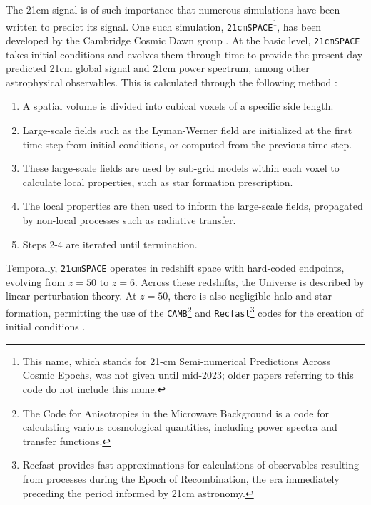\documentclass[floats,floatfix,showpacs,amssymb,prd,superscriptaddress,nofootinbib]{revtex4-2} %
\newcommand{\code}{\texttt}
\begin{document}
The 21cm signal is of such importance that numerous simulations have been written to predict its signal. One such simulation, \code{21cmSPACE}\footnote{This name, which stands for 21-cm Semi-numerical Predictions Across Cosmic Epochs, was not given until mid-2023; older papers referring to this code do not include this name.}, has been developed by the Cambridge Cosmic Dawn group \cite{Fialkov_2014}\cite{Visbal_2012}. At the basic level, \code{21cmSPACE} takes initial conditions and evolves them through time to provide the present-day predicted 21cm global signal and 21cm power spectrum, among other astrophysical observables. This is calculated through the following method \cite{gessey-jones_2024}:

\begin{enumerate}
    \item A spatial volume is divided into cubical voxels of a specific side length.

    \item Large-scale fields such as the Lyman-Werner field are initialized at the first time step from initial conditions, or computed from the previous time step.

    \item These large-scale fields are used by sub-grid models within each voxel to calculate local properties, such as star formation prescription.

    \item The local properties are then used to inform the large-scale fields, propagated by non-local processes such as radiative transfer.

    \item Steps 2-4 are iterated until termination.
\end{enumerate}


Temporally, \code{21cmSPACE} operates in redshift space with hard-coded endpoints, evolving from $z = 50$ to $z = 6$. Across these redshifts, the Universe is described by linear perturbation theory. At $z = 50$, there is also negligible halo and star formation, permitting the use of the \code{CAMB}\footnote{The Code for Anisotropies in the Microwave Background is a code for calculating various cosmological quantities, including power spectra and transfer functions.} and \code{Recfast}\footnote{Recfast provides fast approximations for calculations of observables resulting from processes during the Epoch of Recombination, the era immediately preceding the period informed by 21cm astronomy.} codes for the creation of initial conditions \cite{gessey-jones_2024}.
\end{document}
